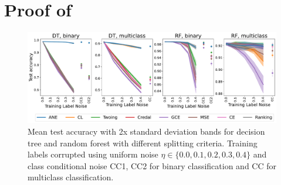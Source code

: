 \documentclass[letterpaper]{article} %
\begin{document}
\section{Proof of }
\label{app:NE-loss}
\negexp*

\begin{figure}[t]
    \centering
    \includegraphics[width=14cm]{figs/cifar10_pretrained_scaled.pdf} 
    \caption{Mean test accuracy with 2x standard deviation bands for decision tree and random forest with different splitting criteria. 
    Training labels corrupted using uniform noise $\eta\in\{0.0,0.1,0.2,0.3,0.4\}$ and class conditional noise CC1, CC2 for binary classification and CC for multiclass classification. 
    }
    \label{fig:pre_trained}
\end{figure}
\end{document}
